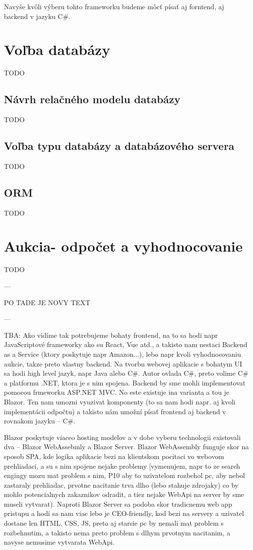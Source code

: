 Navyše kvôli výberu tohto frameworku budeme môcť písať aj forntend, aj backend v jazyku C\#.

\section{Voľba databázy}

TODO

\subsection{Návrh relačného modelu databázy}

TODO

\subsection{Voľba typu databázy a databázového servera}

TODO

\subsection{ORM}

TODO

\section{Aukcia- odpočet a vyhodnocovanie}

TODO

---

PO TADE JE NOVY TEXT

---

TBA: Ako vidíme tak potrebujeme bohaty frontend, na to sa hodi napr JavaScriptové frameworky ako su React, Vue atd., a takisto nam nestaci Backend as a Service (ktory poskytuje napr Amazon...), lebo napr kvoli vyhodnocovaniu aukcie, takze preto vlastny backend. Na tvorbu webovej aplikacie s bohatym UI sa hodi high level jazyk, napr Java alebo C\#. Autor ovlada C\#, preto volime C\# a platformu .NET, ktora je s nim spojena. Backend by sme mohli implementovat pomocou frmeworku ASP.NET MVC. No este existuje ina varianta a tou je Blazor. Ten nam umozni vyuzivat komponenty (to sa nam hodi napr. aj kvoli implementácii odpočtu) a takisto nám umožní písať frontend aj backend v rovnakom jazyku -- C\#.

Blazor poskytuje viaceo hosting modelov a v dobe vyberu technologii existovali dva -- Blazor WebAssebmly a Blazor Server. Blazor WebAssembly funguje skor na sposob SPA, kde logika aplikacie bezi na klientskom pocitaci vo webovom prehliadaci, a su s nim spojene nejake problemy [vymenujem, napr to ze search engingy mozu mat problem s nim, P10 aby to uzivatelom rozbehol pc, aby nebol zastaraly prehliadac, prvotne nacitanie trva dlho (lebo stahuje zdrojaky) co by mohlo potencialnych zakaznikov odradit, a tiez nejake WebApi na server by sme museli vytvarat). Naproti Blazor Server sa podoba skor tradicnemu web app pristupu a hodi sa nam viac lebo je CEO-friendly, kod bezi na servery a uzivatel dostane len HTML, CSS, JS, preto aj starsie pc by nemali mat problem s rozbehnutim, a takisto nema preto problem s dlhym prvotnym nacitanim, a navyse nemusime vytvarata WebApi.


